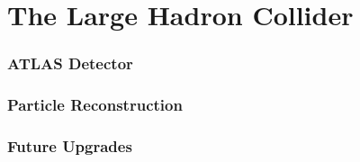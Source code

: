 \part {\LARGE{The Large Hadron Collider}}
\label{sec:LHC}

\section{ATLAS Detector}
\label{sec:ATLAS}


\section{ Particle Reconstruction} 
\label{sec:ParticleReconstruction}


\section{Future Upgrades}
\label{sec:FutureUpgrades}

